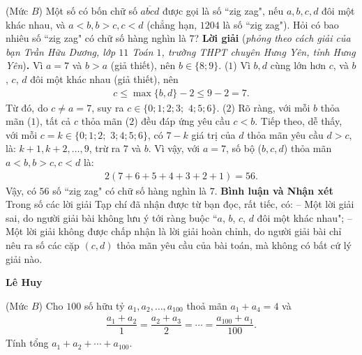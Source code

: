 \begin{multicols}{2}
	\setlength{\abovedisplayskip}{4pt}
	\setlength{\belowdisplayskip}{4pt}
	{}
	(Mức $B$) Một số có bốn chữ số $\overline{a b c d}$ được gọi là số ``zig zag", nếu $a, b, c, d$ đôi một khác nhau, và $a<b, b>c, c<d$ (chẳng hạn, $1204$ là số ``zig zag"). Hỏi có bao nhiêu số ``zig zag" có chữ số hàng nghìn là $7$?
	\vskip 0.05cm
	\textbf{\color{thachthuctoanhoc}Lời giải} (\textit{phỏng theo cách giải của bạn Trần Hữu Dương, lớp $11$ Toán $1$, trường THPT chuyên Hưng Yên, tỉnh Hưng Yên})\textbf{\color{thachthuctoanhoc}.}
	Vì $a = 7$ và $b > a$ (giả thiết), nên $b \in \{8; 9\}$. \hfill ($1$)
	\vskip 0.05cm
	Vì $b, d$ cùng lớn hơn $c$, và $b$, $c$, $d$ đôi một khác nhau (giả thiết), nên
	\begin{align*}
		c \le \max\{b, d\} - 2 \le 9 - 2 = 7.
	\end{align*}
	Từ đó, do $c \ne a = 7$, suy ra $c \in \{0; 1; 2; 3;$ $4; 5; 6\}$. \hfill($2$)
	\vskip 0.05cm
	Rõ ràng, với mỗi $b$ thỏa mãn ($1$), tất cả $c$ thỏa mãn ($2$) đều đáp ứng yêu cầu $c < b$.
	\vskip 0.05cm
	Tiếp theo, dễ thấy, với mỗi $c = k \in \{0; 1; 2;$ $3; 4; 5; 6\}$, có $7 - k$ giá trị của $d$ thỏa mãn yêu cầu $d > c$, là: $k \!+\! 1, k \!+\! 2, \ldots, 9$, trừ ra $7$ và $b$.
	\vskip 0.05cm
	Vì vậy, với $a = 7$, số bộ ($b, c, d$) thỏa mãn $a < b, b > c, c < d$ là:
	\begin{align*}
		2(7 + 6 + 5 + 4 + 3 + 2 + 1) = 56.
	\end{align*}
	Vậy, có $56$ số ``zig zag" có chữ số hàng nghìn là $7$.
	\vskip 0.05cm
	\textbf{\color{thachthuctoanhoc}Bình luận và Nhận xét}
	\vskip 0.05cm	
	Trong số các lời giải Tạp chí đã nhận được từ bạn đọc, rất tiếc, có:
	\vskip 0.05cm
	-- Một lời giải sai, do người giải bài không lưu ý tới ràng buộc ``$a$, $b$, $c$, $d$ đôi một khác nhau";
	\vskip 0.05cm
	-- Một lời giải không được chấp nhận là lời giải hoàn chỉnh, do người giải bài chỉ nêu ra số các cặp $(c, d)$ thỏa mãn yêu cầu của bài toán, mà không có bất cứ lý giải nào.
	\begin{flushright}
		\textbf{\color{thachthuctoanhoc}Lê Huy}
	\end{flushright}
	{}
	(Mức $B$) Cho $100$ số hữu tỷ $a_1,a_2,\ldots,a_{100}$ thoả mãn $a_1+a_4=4$ và
	\begin{align*}
		\dfrac{a_1+a_2}1=\dfrac{a_2+a_3}2=\cdots=\dfrac{a_{100}+a_1}{100}.
	\end{align*}
	Tính tổng $a_1+ a_2 +\cdots+a_{100}$. 
	

\end{multicols}

